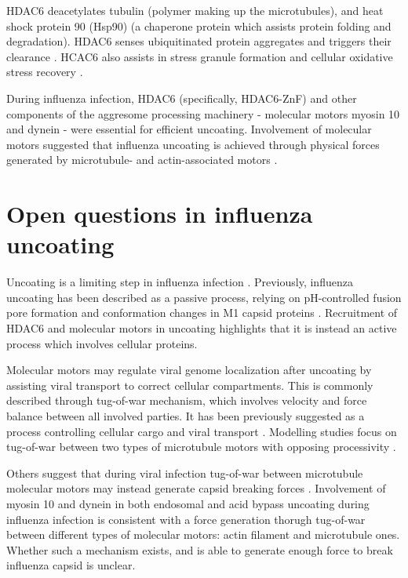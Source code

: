HDAC6 deacetylates tubulin \cite{zhang2003hdac, zhang2008mice} (polymer making up the microtubules), and heat shock protein 90 (Hsp90) \cite{kovacs2005hdac6} (a chaperone protein which assists protein folding and degradation). HDAC6 senses ubiquitinated protein aggregates and triggers their clearance \cite{boyault2007hdac6}. HCAC6 also assists in stress granule formation and cellular oxidative stress recovery \cite{kwon2007deacetylase}.

During influenza infection, HDAC6 (specifically, HDAC6-ZnF) and other components of the aggresome processing machinery - molecular motors myosin 10 and dynein - were essential for efficient uncoating. Involvement of molecular motors suggested that influenza uncoating is achieved through physical forces generated by microtubule- and actin-associated motors \cite{banerjee2014influenza}.

\section{Open questions in influenza uncoating}

Uncoating is a limiting step in influenza infection \cite{banerjee2013high}. Previously, influenza uncoating has been described as a passive process, relying on pH-controlled fusion pore formation and conformation changes in M1 capsid proteins \cite{zhang2012dissection}. Recruitment of HDAC6 and molecular motors in uncoating \cite{banerjee2014influenza} highlights that it is instead an active process which involves cellular proteins.

Molecular motors may regulate viral genome localization after uncoating \cite{qin2019real} by assisting viral transport to correct cellular compartments. This is commonly described through tug-of-war mechanism, which involves velocity and force balance between all involved parties. It has been previously suggested as a process controlling cellular cargo and viral transport \cite{gazzola2009stochastic}. Modelling studies focus on tug-of-war between two types of microtubule motors with opposing processivity \cite{muller2008tug, gazzola2009stochastic}.

Others suggest that during viral infection tug-of-war between microtubule molecular motors may instead generate capsid breaking forces \cite{strunze2011kinesin,lukic2014hiv}. Involvement of myosin 10 and dynein in both endosomal and acid bypass uncoating during influenza infection is consistent with a force generation thorugh tug-of-war between different types of molecular motors: actin filament and microtubule ones. Whether such a mechanism exists, and is able to generate enough force to break influenza capsid is unclear.

